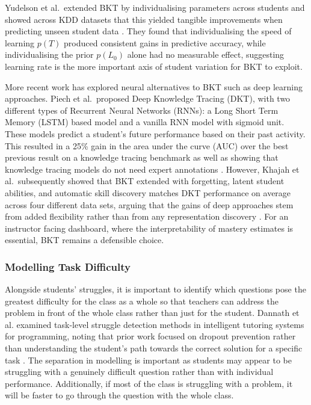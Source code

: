 Yudelson et al.\ extended BKT by individualising parameters across students and showed across KDD datasets that this yielded tangible improvements when predicting unseen student data \cite{yudelsonIndividualizedBayesianKnowledge2013}. They found that individualising the speed of learning $p(T)$ produced consistent gains in predictive accuracy, while individualising the prior $p(L_0)$ alone had no measurable effect, suggesting learning rate is the more important axis of student variation for BKT to exploit.

More recent work has explored neural alternatives to BKT such as deep learning approaches. Piech et al.\ proposed Deep Knowledge Tracing (DKT),  with two different types of Recurrent Neural Networks (RNNs): a Long Short Term Memory (LSTM) based model and a vanilla RNN model with sigmoid unit. These models predict a student's future performance based on their past activity. This resulted in a 25\% gain in the area under the curve (AUC) over the best previous result on a knowledge tracing benchmark as well as showing that knowledge tracing models do not need expert annotations \cite{piechDeepKnowledgeTracing2015}.
However, Khajah et al.\ subsequently showed that BKT extended with forgetting, latent student abilities, and automatic skill discovery matches DKT performance on average across four different data sets, arguing that the gains of deep approaches stem from added flexibility rather than from any representation discovery \cite{khajahHowDeepKnowledge2016}.
For an instructor facing dashboard, where the interpretability of mastery estimates is essential, BKT remains a defensible choice.

\subsubsection{Modelling Task Difficulty}


Alongside students' struggles, it is important to identify which questions pose the greatest difficulty for the class as a whole so that teachers can address the problem in front of the whole class rather than just for the student.
Dannath et al. examined task-level struggle detection methods in intelligent tutoring systems for programming, noting that prior work focused on dropout prevention rather than understanding the student's path towards the correct solution for a specific task \cite{dannath_evaluating}.
The separation in modelling is important as students may appear to be struggling with a genuinely difficult question rather than with individual performance. 
Additionally, if most of the class is struggling with a problem, it will be faster to go through the question with the whole class.

